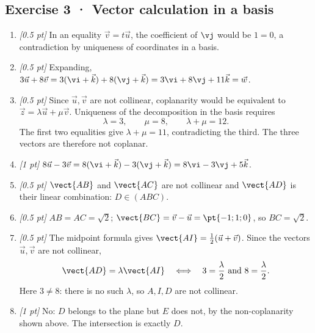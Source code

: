 \subsection*{Exercise 3 · Vector calculation in a basis}\begin{enumerate}

\item \textit{[0.5 pt]} In an equality $\vec v=t\vec u$, the coefficient of $\vj $ would be $1=0$, a contradiction by uniqueness of coordinates in a basis.

\item \textit{[0.5 pt]} Expanding, $3\vec u+8\vec v=3(\vi +\vec k)+8(\vj +\vec k)=3\vi +8\vj +11\vec k=\vec w$.

\item \textit{[0.5 pt]} Since $\vec u,\vec v$ are not collinear, coplanarity would be equivalent to $\vec z=\lambda\vec u+\mu\vec v$. Uniqueness of the decomposition in the basis requires
\[\lambda=3,\qquad\mu=8,\qquad\lambda+\mu=12.\]
The first two equalities give $\lambda+\mu=11$, contradicting the third. The three vectors are therefore not coplanar.

\item \textit{[1 pt]} $8\vec u-3\vec v=8(\vi +\vec k)-3(\vj +\vec k)=8\vi -3\vj +5\vec k$.

\item \textit{[0.5 pt]} $\vect{AB}$ and $\vect{AC}$ are not collinear and $\vect{AD}$ is their linear combination: $D\in(ABC)$.

\item \textit{[0.5 pt]} $AB=AC=\sqrt2$; $\vect{BC}=\vec v-\vec u=\pt{-1;1;0}$, so $BC=\sqrt2$.

\item \textit{[0.5 pt]} The midpoint formula gives $\vect{AI}=\frac12(\vec u+\vec v)$. Since the vectors $\vec u,\vec v$ are not collinear,
\[\vect{AD}=\lambda\vect{AI}\quad\Longleftrightarrow\quad 3=\frac{\lambda}{2}\ \text{and}\ 8=\frac{\lambda}{2}.\]
Here $3\ne 8$: there is no such $\lambda$, so $A,I,D$ are not collinear.

\item \textit{[1 pt]} No: $D$ belongs to the plane but $E$ does not, by the non-coplanarity shown above. The intersection is exactly $D$.

\end{enumerate}

